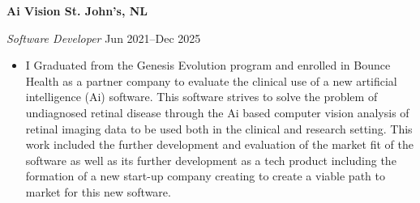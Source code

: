 \textbf{Ai Vision \hfill St. John's, NL}\par

\textit{Software Developer} \hfill Jun 2021--Dec 2025
\begin{itemize}
	\item I Graduated from the Genesis Evolution program and enrolled in Bounce Health as a partner company to evaluate the clinical use of a new artificial intelligence (Ai) software.  This software strives to solve the problem of undiagnosed retinal disease through the Ai based computer vision analysis of retinal imaging data to be used both in the clinical and research setting.  This work included the further development and evaluation of the market fit of the software as well as its further development as a tech product including the formation of a new start-up company creating to create a viable path to market for this new software. 
\end{itemize}\par